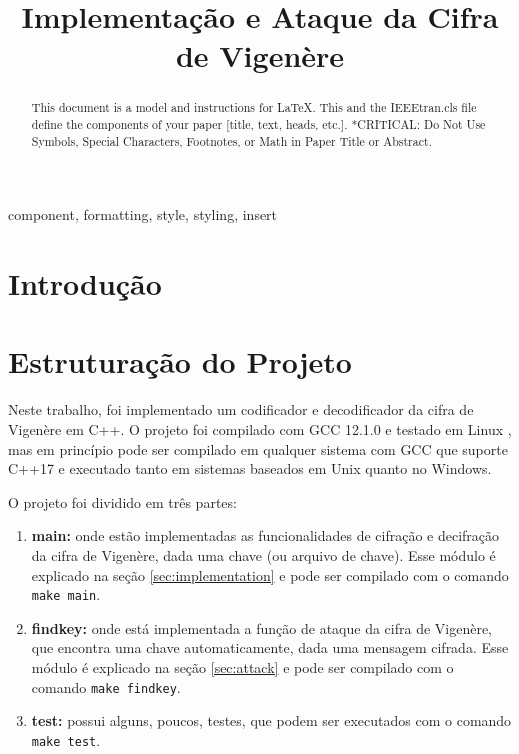 \documentclass[conference]{IEEEtran}
\begin{document}
\title{Implementação e Ataque da Cifra de Vigenère}

\author{
}

\maketitle

\begin{abstract}
    \cite{teste}
This document is a model and instructions for \LaTeX.
This and the IEEEtran.cls file define the components of your paper [title, text, heads, etc.]. *CRITICAL: Do Not Use Symbols, Special Characters, Footnotes, 
or Math in Paper Title or Abstract.
\end{abstract}

\begin{IEEEkeywords}
component, formatting, style, styling, insert
\end{IEEEkeywords}

\section{Introdução}

\section{Estruturação do Projeto}
Neste trabalho, foi implementado um codificador e decodificador da cifra de
Vigenère em C++. O projeto foi compilado com GCC 12.1.0 e testado em Linux , mas
em princípio pode ser compilado em qualquer sistema com GCC que suporte C++17 e
executado tanto em sistemas baseados em Unix quanto no Windows. 

O projeto foi dividido em três partes:

\begin{enumerate}
    \item \textbf{main:} onde estão implementadas as funcionalidades de cifração
        e decifração da cifra de Vigenère, dada uma chave (ou arquivo de chave).
        Esse módulo é explicado na seção \ref{sec:implementation} e pode ser
        compilado com o comando \verb|make main|.
    \item \textbf{findkey:} onde está implementada a função de ataque da
        cifra de Vigenère, que encontra uma chave automaticamente, dada uma
        mensagem cifrada. Esse módulo é explicado na seção \ref{sec:attack} e
        pode ser compilado com o comando \verb|make findkey|. 
    \item \textbf{test:} possui alguns, poucos, testes, que podem ser executados
        com o comando \verb|make test|.
\end{enumerate}
\end{document}
